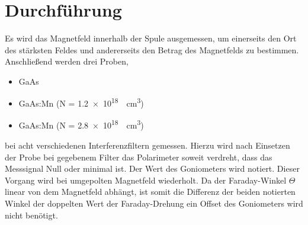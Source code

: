 \section{Durchführung}
\label{sec:Durchfuehrung}
Es wird das Magnetfeld innerhalb der Spule ausgemessen, um einerseits den Ort des stärksten Feldes und andererseits den Betrag des Magnetfelds zu bestimmen.
Anschließend werden drei Proben,
\begin{itemize}
    \item{GaAs}
    \item{GaAs:Mn (N = \SI{1.2e18}{\per\centi\meter\cubed})}
    \item{GaAs:Mn (N = \SI{2.8e18}{\per\centi\meter\cubed})}
\end{itemize}
bei acht verschiedenen Interferenzfiltern gemessen.
Hierzu wird nach Einsetzen der Probe bei gegebenem Filter das Polarimeter soweit verdreht,
dass das Messsignal Null oder minimal ist. Der Wert des Goniometers wird notiert.
Dieser Vorgang wird bei umgepolten Magnetfeld wiederholt. Da der Faraday-Winkel $\Theta$ linear von dem Magnetfeld abhängt,
ist somit die Differenz der beiden notierten Winkel der doppelten Wert der Faraday-Drehung ein Offset des Goniometers wird nicht benötigt.
